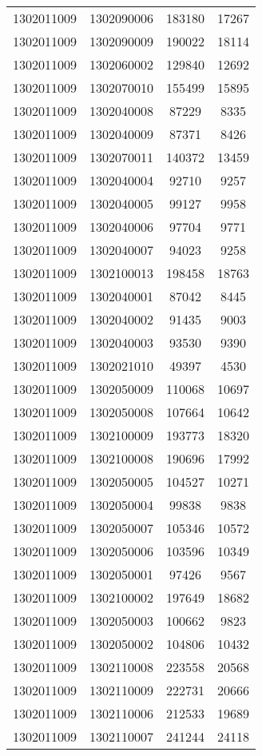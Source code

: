 \begin{longtable}{llcc}
1302011009 & 1302090006 & 183180 & 17267\\
1302011009 & 1302090009 & 190022 & 18114\\
1302011009 & 1302060002 & 129840 & 12692\\
1302011009 & 1302070010 & 155499 & 15895\\
1302011009 & 1302040008 & 87229 & 8335\\
1302011009 & 1302040009 & 87371 & 8426\\
1302011009 & 1302070011 & 140372 & 13459\\
1302011009 & 1302040004 & 92710 & 9257\\
1302011009 & 1302040005 & 99127 & 9958\\
1302011009 & 1302040006 & 97704 & 9771\\
1302011009 & 1302040007 & 94023 & 9258\\
1302011009 & 1302100013 & 198458 & 18763\\
1302011009 & 1302040001 & 87042 & 8445\\
1302011009 & 1302040002 & 91435 & 9003\\
1302011009 & 1302040003 & 93530 & 9390\\
1302011009 & 1302021010 & 49397 & 4530\\
1302011009 & 1302050009 & 110068 & 10697\\
1302011009 & 1302050008 & 107664 & 10642\\
1302011009 & 1302100009 & 193773 & 18320\\
1302011009 & 1302100008 & 190696 & 17992\\
1302011009 & 1302050005 & 104527 & 10271\\
1302011009 & 1302050004 & 99838 & 9838\\
1302011009 & 1302050007 & 105346 & 10572\\
1302011009 & 1302050006 & 103596 & 10349\\
1302011009 & 1302050001 & 97426 & 9567\\
1302011009 & 1302100002 & 197649 & 18682\\
1302011009 & 1302050003 & 100662 & 9823\\
1302011009 & 1302050002 & 104806 & 10432\\
1302011009 & 1302110008 & 223558 & 20568\\
1302011009 & 1302110009 & 222731 & 20666\\
1302011009 & 1302110006 & 212533 & 19689\\
1302011009 & 1302110007 & 241244 & 24118\\

\end{longtable}
